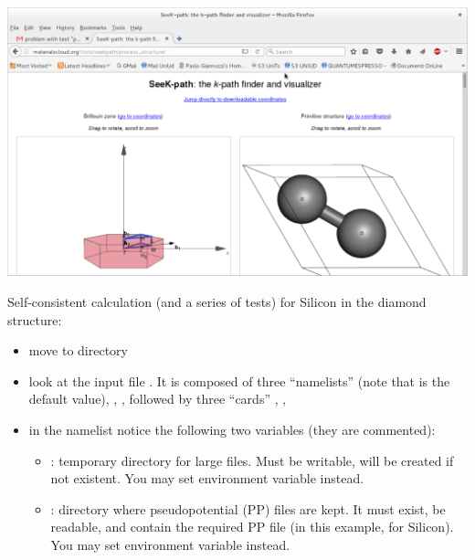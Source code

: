 \documentclass[landscape]{foils}
\begin{document}
~\\
\centerline{\includegraphics[width=24cm]{figs/seekpath.pdf}}

%
Self-consistent calculation (and a series of tests) for Silicon in the
diamond structure:
\begin{itemize}
\item move to  directory
\item look at the input file . It is composed of three
``namelists''  (note that 
is the default value), , , followed 
by three ``cards'' , ,
\item in the  namelist notice the following two
  variables (they are commented):
  \begin{itemize}
  \item {}: temporary directory for large files.
    Must be writable, will be created if not existent.
    You may set environment variable  instead.\\[-0.5em]
    
  \item {}: directory where pseudopotential (PP)
    files are kept.
    It must exist, be readable, and contain the required PP file
    (in this example,  for Silicon).
    You may set environment variable 
    instead.
  \end{itemize}
\end{itemize}
\end{document}
